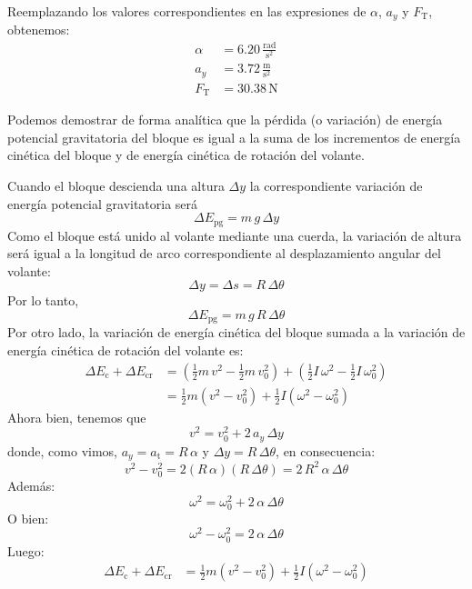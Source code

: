 \documentclass[addpoints]{exam}
\begin{document}
\begin{questions}
\begin{solution}
    Reemplazando los valores correspondientes en las expresiones de $\alpha$, $a_y$ y $F_\text{T}$, obtenemos:
    \begin{align*}
        \alpha &= 6.20 \, \frac{\text{rad}}{\text{s}^2} \\
        a_y &= 3.72 \, \frac{\text{m}}{\text{s}^2} \\
            F_\text{T} &= 30.38 \, \text{N}
    \end{align*}

    Podemos demostrar de forma analítica que la pérdida (o variación) de energía potencial gravitatoria del bloque es igual a la suma de los incrementos de energía cinética del bloque y de energía cinética de rotación del volante.

    Cuando el bloque descienda una altura $\Delta y$ la correspondiente variación de energía potencial gravitatoria será $$\Delta E_\text{pg} = m \, g \, \Delta y$$ Como el bloque está unido al volante mediante una cuerda, la variación de altura será igual a la longitud de arco correspondiente al desplazamiento angular del volante: $$\Delta y = \Delta s = R \, \Delta \theta$$ Por lo tanto, $$\Delta E_\text{pg} = m \, g \, R \, \Delta \theta$$ Por otro lado, la variación de energía cinética del bloque sumada a la variación de energía cinética de rotación del volante es: 
    \begin{equation*}
        \begin{split}
        \Delta E_\text{c} + \Delta E_\text{cr} &= \left(\frac{1}{2} m \, v^2 - \frac{1}{2} m \, v_0^2\right) + \left(\frac{1}{2} I \, \omega^2 - \frac{1}{2} I \, \omega_0^2\right) \\
        &= \frac{1}{2} m \left(v^2 - v_0^2\right) + \frac{1}{2} I \left(\omega^2 - \omega_0^2\right)
        \end{split}
    \end{equation*} Ahora bien, tenemos que $$v^2 = v_0^2 + 2 \, a_y \, \Delta y$$ donde, como vimos, $a_y = a_\text{t} = R \, \alpha$ y $\Delta y = R \, \Delta \theta$, en consecuencia: $$v^2 - v_0^2 = 2 \left(R \, \alpha\right) \left(R \, \Delta \theta\right) = 2 \, R^2 \, \alpha \, \Delta \theta$$ Además: $$\omega^2 = \omega_0^2 + 2 \, \alpha \, \Delta \theta$$ O bien: $$\omega^2 - \omega_0^2 = 2 \, \alpha \, \Delta \theta$$ Luego:
    \begin{equation*}
        \begin{split}
        \Delta E_\text{c} + \Delta E_\text{cr} &= \frac{1}{2} m \left(v^2 - v_0^2\right) + \frac{1}{2} I \left(\omega^2 - \omega_0^2\right) \\

\end{split}
\end{equation*}
\end{solution}
\end{questions}
\end{document}

